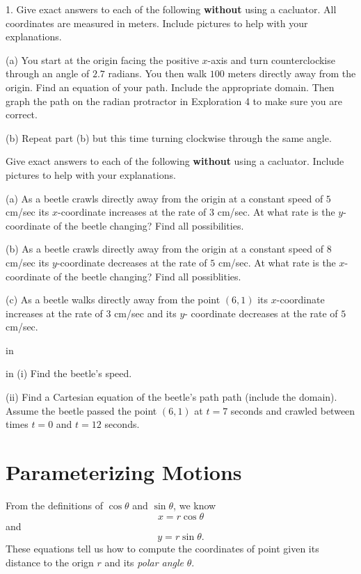 \documentclass{ximera}
\newcommand{\pskip}{\vskip 0.1 in}
\begin{document}
\begin{question}  \label{Qsdg53:Cosine}
1. Give exact answers to each of the following {\bf without} using a cacluator. All coordinates are measured in meters. Include pictures to help with your explanations.

(a) You start at the origin facing the positive $x$-axis and turn counterclockise through an angle of $2.7$ radians. You then walk $100$ meters directly away from the origin. Find an equation of your path. Include the appropriate domain. Then graph the path on the radian protractor in Exploration 4 to make sure you are correct.

(b) Repeat part (b) but this time turning clockwise through the same angle. 


\end{question}



\begin{question} \label{Qet433:Cosine}
Give exact answers to each of the following {\bf without} using a cacluator. Include pictures to help with your explanations.

(a) As a beetle crawls directly away from the origin at a constant speed of $5$ cm/sec its $x$-coordinate increases at the rate of $3$ cm/sec. At what rate is the $y$-coordinate of the beetle changing? Find all possibilities. 

(b) As a beetle crawls directly away from the origin at a constant speed of $8$ cm/sec its $y$-coordinate decreases at the rate of $5$ cm/sec. At what rate is the $x$-coordinate of the beetle changing? Find all possiblities. 

(c) As a beetle walks directly away from the point $(6,1)$ its $x$-coordinate increases at the rate of $3$ cm/sec and its $y$-
coordinate decreases at the rate of $5$ cm/sec. 

\pskip

 in (i) Find the beetle's speed. 

(ii) Find a Cartesian equation of the beetle's path path (include the domain). Assume the beetle passed the point $(6,1)$ at $t=7$ seconds and crawled between times $t=0$ and $t=12$ seconds. 


\end{question}




\section{Parameterizing Motions}
From the definitions of $\cos\theta$ and $\sin \theta$, we know
\[
    x = r \cos \theta 
\]
and
\[
      y=r\sin \theta .
\]
These equations tell us how to compute the coordinates of point given its distance to the orign $r$ and its \emph{polar angle} $\theta$.
\end{document}
